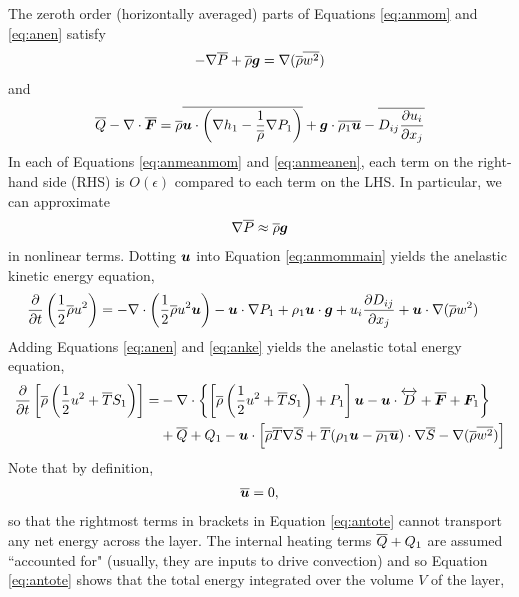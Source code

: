 \documentclass[12pt]{article}
\newcommand{\vecf}{\bm{F}}
\begin{document}
  The zeroth order (horizontally averaged) parts of Equations \eqref{eq:anmom} and \eqref{eq:anen} satisfy 
  \begin{align}\label{eq:anmeanmom}
  	-\nabla\overline{P} + \overline{\rho}\bm{g} = \nabla(\overline{\rho} \overline{w^2})
  \end{align}
  and
  \begin{align}\label{eq:anmeanen}
  	\qref - \Div\overline{\vecf} = \rhoref\overline{\vecu\cdot\left(\nabla h_1-\frac{1}{\rhoref}\nabla P_1\right)} + \vecg\cdot\overline{\rho_1\vecu} - \overline{D_{ij}\pderiv{u_i}{x_j}}
  \end{align}
  In each of Equations \eqref{eq:anmeanmom} and \eqref{eq:anmeanen}, each term on the right-hand side (RHS) is $O(\epsilon)$ compared to each term on the LHS. In particular, we can approximate 
  \begin{align}
  	\nabla\overline{P}\approx \overline{\rho}\bm{g}
  \end{align}
  in nonlinear terms. Dotting $\bm{u}$ into Equation \eqref{eq:anmommain} yields the anelastic kinetic energy equation,
	\begin{subequations}\label{eq:anke}
	\begin{align}
		\frac{\partial}{\partial t}\left(\frac{1}{2}\overline{\rho} u^2\right)&=-\nabla\cdot\left(\frac{1}{2}\overline{\rho} u^2\bm{u} \right) - \bm{u}\cdot\nabla P_1 + \rho_1\bm{u}\cdot\bm{g} + u_i\frac{\partial D_{ij}}{\partial x_j} + \bm{u}\cdot\nabla(\overline{\rho} w^2)
	\end{align}
\end{subequations}
Adding Equations \eqref{eq:anen} and \eqref{eq:anke} yields the anelastic total energy equation,
\begin{align}\label{eq:antote}
			\pderiv{}{t}\left[\rhoref\left(\frac{1}{2} u^2 + \tmpref S_1\right)\right] = &-\Div\left\{\left[\rhoref\left(\frac{1}{2} u^2 + \tmpref S_1\right) + P_1\right]\vecu- \vecu\cdot\overleftrightarrow{D} + \overline{\vecf} + \vecf_1\right\}\nonumber\\
			 &+ \qref + Q_1 - \vecu\cdot\left[\rhoref\tmpref\nabla\sref + \tmpref(\rho_1\vecu-\overline{\rho_1\vecu})\cdot\nabla\sref - \nabla (\rhoref \overline{w^2})\right]
\end{align}
Note that by definition, 
\begin{align}
	\overline{\bm{u}}=0,
\end{align}
so that the rightmost terms in brackets in Equation \eqref{eq:antote} cannot transport any net energy across the layer. The internal heating terms $\overline{Q} + Q_1$ are assumed ``accounted for" (usually, they are inputs to drive convection) and so Equation \eqref{eq:antote} shows that the total energy integrated over the volume $V$ of the layer,
\end{document}
